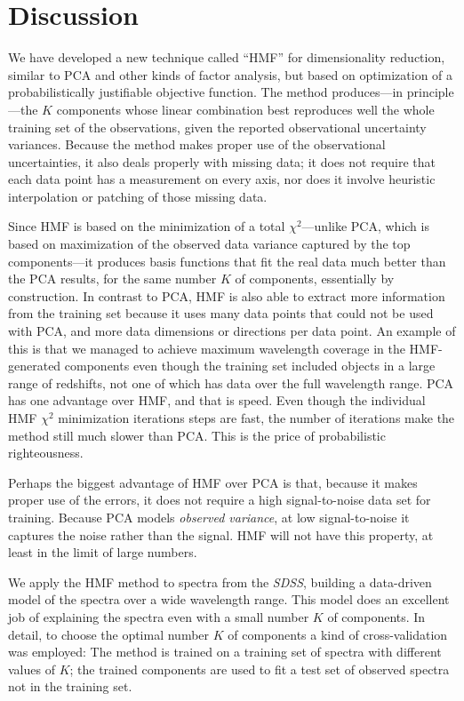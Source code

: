 \documentclass[12pt,preprint]{aastex}
\newcommand{\project}[1]{\textsl{#1}}
\newcommand{\sdss}{\project{SDSS}}
\newcommand{\SDSS}{\sdss}
\begin{document}
\section{Discussion}\label{sec:discussion}
We have developed a new technique called ``HMF'' for dimensionality
reduction, similar to PCA and other kinds of factor analysis, but
based on optimization of a probabilistically justifiable objective
function.  The method produces---in principle---the $K$ components
whose linear combination best reproduces well the whole training set
of the observations, given the reported observational uncertainty
variances.  Because the method makes proper use of the observational
uncertainties, it also deals properly with missing data; it does not
require that each data point has a measurement on every axis, nor does
it involve heuristic interpolation or patching of those missing data.

Since HMF is based on the minimization of a total $\chi^2$---unlike
PCA, which is based on maximization of the observed data variance
captured by the top components---it produces basis functions that fit
the real data much better than the PCA results, for the same number
$K$ of components, essentially by construction.  In contrast to PCA,
HMF is also able to extract more information from the training set
because it uses many data points that could not be used with PCA, and
more data dimensions or directions per data point. An example of this
is that we managed to achieve maximum wavelength coverage in the
HMF-generated components even though the training set included objects
in a large range of redshifts, not one of which has data over the full
wavelength range.  PCA has one advantage over HMF, and that is
speed. Even though the individual HMF $\chi^2$ minimization iterations
steps are fast, the number of iterations make the method still much
slower than PCA. This is the price of probabilistic righteousness.

Perhaps the biggest advantage of HMF over PCA is that, because it
makes proper use of the errors, it does not require a high
signal-to-noise data set for training.  Because PCA models
\emph{observed variance}, at low signal-to-noise it captures the noise
rather than the signal.  HMF will not have this property, at least in
the limit of large numbers.

We apply the HMF method to spectra from the \SDSS, building a data-driven
model of the spectra over a wide wavelength range.  This model does an
excellent job of explaining the spectra even with a small number $K$
of components.  In detail, to choose the optimal number $K$ of
components a kind of cross-validation was employed: The method is
trained on a training set of spectra with different values of $K$; the
trained components are used to fit a test set of observed spectra not
in the training set.
\end{document}
